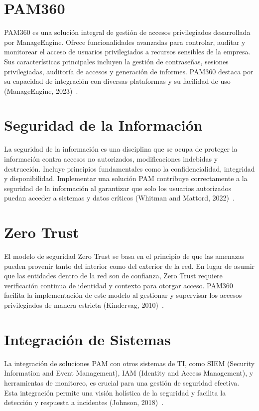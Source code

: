 \section{PAM360}
PAM360 es una solución integral de gestión de accesos privilegiados desarrollada por ManageEngine. Ofrece funcionalidades avanzadas para controlar, auditar y monitorear el acceso de usuarios privilegiados a recursos sensibles de la empresa. Sus características principales incluyen la gestión de contraseñas, sesiones privilegiadas, auditoría de accesos y generación de informes. PAM360 destaca por su capacidad de integración con diversas plataformas y su facilidad de uso (ManageEngine, 2023)~\cite{manageengine2023pam360}.

\section{Seguridad de la Información}
La seguridad de la información es una disciplina que se ocupa de proteger la información contra accesos no autorizados, modificaciones indebidas y destrucción. Incluye principios fundamentales como la confidencialidad, integridad y disponibilidad. Implementar una solución PAM contribuye correctamente a la seguridad de la información al garantizar que solo los usuarios autorizados puedan acceder a sistemas y datos críticos (Whitman and Mattord, 2022)~\cite{whitman2022security}.

\section{Zero Trust}

El modelo de seguridad Zero Trust se basa en el principio de que las amenazas pueden provenir tanto del interior como del exterior de la red. En lugar de asumir que las entidades dentro de la red son de confianza, Zero Trust requiere verificación continua de identidad y contexto para otorgar acceso. PAM360 facilita la implementación de este modelo al gestionar y supervisar los accesos privilegiados de manera estricta (Kindervag, 2010)~\cite{kindervag2010zero}.

\section{Integración de Sistemas}

La integración de soluciones PAM con otros sistemas de TI, como SIEM (Security Information and Event Management), IAM (Identity and Access Management), y herramientas de monitoreo, es crucial para una gestión de seguridad efectiva. Esta integración permite una visión holística de la seguridad y facilita la detección y respuesta a incidentes (Johnson, 2018)~\cite{johnson2018integration}.

